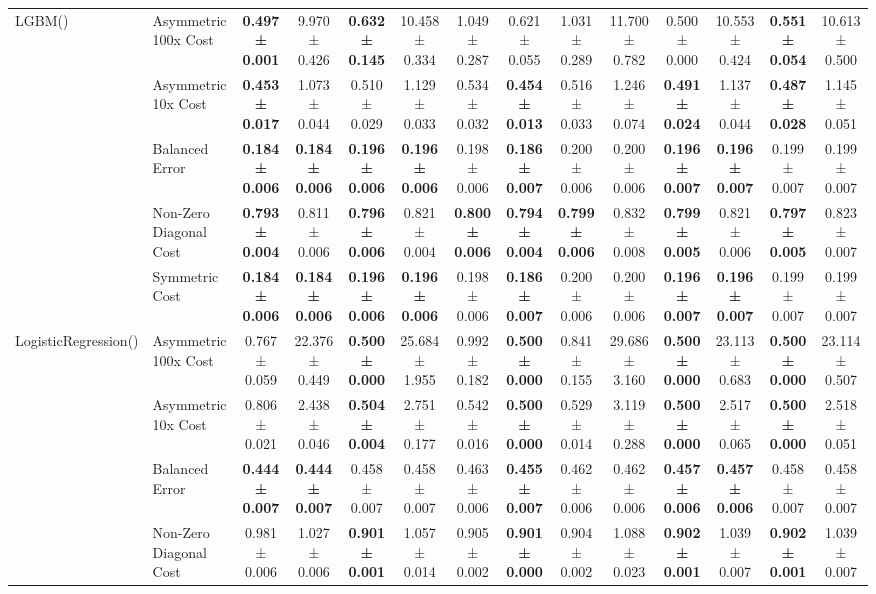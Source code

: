 \begin{table}[H]
{\begin{tabular}{llcccccccccccc}
\cline{1-14}
\multirow[t]{5}{*}{LGBM()} & Asymmetric 100x Cost & \textbf{0.497 ± 0.001} & 9.970 ± 0.426 & \textbf{0.632 ± 0.145} & 10.458 ± 0.334 & 1.049 ± 0.287 & 0.621 ± 0.055 & 1.031 ± 0.289 & 11.700 ± 0.782 & 0.500 ± 0.000 & 10.553 ± 0.424 & \textbf{0.551 ± 0.054} & 10.613 ± 0.500 \\
 & Asymmetric 10x Cost & \textbf{0.453 ± 0.017} & 1.073 ± 0.044 & 0.510 ± 0.029 & 1.129 ± 0.033 & 0.534 ± 0.032 & \textbf{0.454 ± 0.013} & 0.516 ± 0.033 & 1.246 ± 0.074 & \textbf{0.491 ± 0.024} & 1.137 ± 0.044 & \textbf{0.487 ± 0.028} & 1.145 ± 0.051 \\
 & Balanced Error & \textbf{0.184 ± 0.006} & \textbf{0.184 ± 0.006} & \textbf{0.196 ± 0.006} & \textbf{0.196 ± 0.006} & 0.198 ± 0.006 & \textbf{0.186 ± 0.007} & 0.200 ± 0.006 & 0.200 ± 0.006 & \textbf{0.196 ± 0.007} & \textbf{0.196 ± 0.007} & 0.199 ± 0.007 & 0.199 ± 0.007 \\
 & Non-Zero Diagonal Cost & \textbf{0.793 ± 0.004} & 0.811 ± 0.006 & \textbf{0.796 ± 0.006} & 0.821 ± 0.004 & \textbf{0.800 ± 0.006} & \textbf{0.794 ± 0.004} & \textbf{0.799 ± 0.006} & 0.832 ± 0.008 & \textbf{0.799 ± 0.005} & 0.821 ± 0.006 & \textbf{0.797 ± 0.005} & 0.823 ± 0.007 \\
 & Symmetric Cost & \textbf{0.184 ± 0.006} & \textbf{0.184 ± 0.006} & \textbf{0.196 ± 0.006} & \textbf{0.196 ± 0.006} & 0.198 ± 0.006 & \textbf{0.186 ± 0.007} & 0.200 ± 0.006 & 0.200 ± 0.006 & \textbf{0.196 ± 0.007} & \textbf{0.196 ± 0.007} & 0.199 ± 0.007 & 0.199 ± 0.007 \\
\cline{1-14}
\multirow[t]{5}{*}{LogisticRegression()} & Asymmetric 100x Cost & 0.767 ± 0.059 & 22.376 ± 0.449 & \textbf{0.500 ± 0.000} & 25.684 ± 1.955 & 0.992 ± 0.182 & \textbf{0.500 ± 0.000} & 0.841 ± 0.155 & 29.686 ± 3.160 & \textbf{0.500 ± 0.000} & 23.113 ± 0.683 & \textbf{0.500 ± 0.000} & 23.114 ± 0.507 \\
 & Asymmetric 10x Cost & 0.806 ± 0.021 & 2.438 ± 0.046 & \textbf{0.504 ± 0.004} & 2.751 ± 0.177 & 0.542 ± 0.016 & \textbf{0.500 ± 0.000} & 0.529 ± 0.014 & 3.119 ± 0.288 & \textbf{0.500 ± 0.000} & 2.517 ± 0.065 & \textbf{0.500 ± 0.000} & 2.518 ± 0.051 \\
 & Balanced Error & \textbf{0.444 ± 0.007} & \textbf{0.444 ± 0.007} & 0.458 ± 0.007 & 0.458 ± 0.007 & 0.463 ± 0.006 & \textbf{0.455 ± 0.007} & 0.462 ± 0.006 & 0.462 ± 0.006 & \textbf{0.457 ± 0.006} & \textbf{0.457 ± 0.006} & 0.458 ± 0.007 & 0.458 ± 0.007 \\
 & Non-Zero Diagonal Cost & 0.981 ± 0.006 & 1.027 ± 0.006 & \textbf{0.901 ± 0.001} & 1.057 ± 0.014 & 0.905 ± 0.002 & \textbf{0.901 ± 0.000} & 0.904 ± 0.002 & 1.088 ± 0.023 & \textbf{0.902 ± 0.001} & 1.039 ± 0.007 & \textbf{0.902 ± 0.001} & 1.039 ± 0.007 \\

\end{tabular}}
\end{table}
